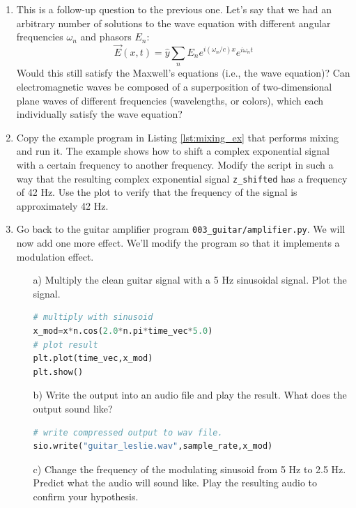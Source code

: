 \begin{enumerate}
\item This is a follow-up question to the previous one. Let's say that we had an arbitrary number of solutions to the wave equation with different angular frequencies $\omega_n$ and phasors $E_n$:
\begin{equation}
    \vec{E}(x,t) = \hat{y}\sum_n E_n e^{i (\omega_n/c) x} e^{i \omega_n t}
\end{equation}
Would this still satisfy the Maxwell's equations (i.e., the wave equation)? Can electromagnetic waves be composed of a superposition of two-dimensional plane waves of different frequencies (wavelengths, or colors), which each individually satisfy the wave equation?


\item Copy the example program in Listing \ref{lst:mixing_ex} that performs mixing and run it. The example shows how to shift a complex exponential signal with a certain frequency to another frequency. 
Modify the script in such a way that the resulting complex exponential signal \verb|z_shifted| has a frequency of 42 Hz. Use the plot to verify that the frequency of the signal is approximately 42 Hz.


\item Go back to the guitar amplifier program
  \texttt{003\_guitar/amplifier.py}. We will now add one more
  effect. We'll modify the program so that it implements a modulation effect.

\begin{itemize}
\item[a)] Multiply the clean guitar signal with a 5 Hz sinusoidal signal. Plot the signal.
\begin{lstlisting}[language=Python]
# multiply with sinusoid
x_mod=x*n.cos(2.0*n.pi*time_vec*5.0)
# plot result
plt.plot(time_vec,x_mod)
plt.show()
\end{lstlisting}
\item[b)] Write the output into an audio file and play the
  result. What does the output sound like? 
\begin{lstlisting}[language=Python]
# write compressed output to wav file. 
sio.write("guitar_leslie.wav",sample_rate,x_mod)
\end{lstlisting}

\item[c)] Change the frequency of the modulating sinusoid from 5 Hz to 2.5 Hz. Predict what the audio will sound like. Play the resulting audio to confirm your hypothesis.


\end{itemize}
\end{enumerate}
